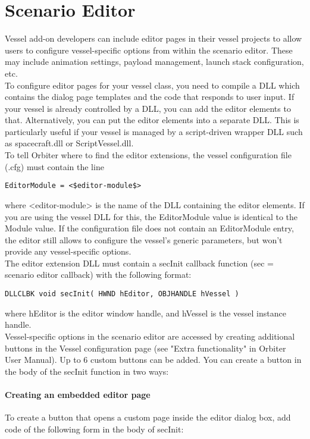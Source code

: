 \documentclass[Orbiter Developer Manual.tex]{subfiles}
\begin{document}
\section{Scenario Editor}
Vessel add-on developers can include editor pages in their vessel projects to allow users to configure vessel-specific options from within the scenario editor. These may include animation settings, payload management, launch stack configuration, etc.\\
To configure editor pages for your vessel class, you need to compile a DLL which contains the dialog page templates and the code that responds to user input. If your vessel is already controlled by a DLL, you can add the editor elements to that. Alternatively, you can put the editor elements into a separate DLL. This is particularly useful if your vessel is managed by a script-driven wrapper DLL such as spacecraft.dll or ScriptVessel.dll.\\
To tell Orbiter where to find the editor extensions, the vessel configuration file (.cfg) must contain the line

\begin{lstlisting}[language=OSFS,mathescape=true]
EditorModule = <$editor-module$>
\end{lstlisting}

\noindent
where <editor-module> is the name of the DLL containing the editor elements. If you are using the vessel DLL for this, the EditorModule value is identical to the Module value. If the configuration file does not contain an EditorModule entry, the editor still allows to configure the vessel's generic parameters, but won't provide any vessel-specific options.\\
The editor extension DLL must contain a secInit callback function (sec = scenario editor callback) with the following format:

\begin{lstlisting}
DLLCLBK void secInit( HWND hEditor, OBJHANDLE hVessel )
\end{lstlisting}

\noindent
where hEditor is the editor window handle, and hVessel is the vessel instance handle.\\
Vessel-specific options in the scenario editor are accessed by creating additional buttons in the Vessel configuration page (see "Extra functionality" in Orbiter User Manual). Up to 6 custom buttons can be added. You can create a button in the body of the secInit function in two ways:

\paragraph{Creating an embedded editor page}
To create a button that opens a custom page inside the editor dialog box, add code of the following form in the body of secInit:
\end{document}
